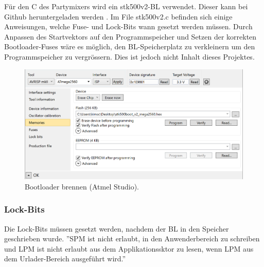 Für den \textmu C des Partymixers wird ein stk500v2-BL verwendet. Dieser kann bei Github heruntergeladen werden \cite{sproul_arduinoarduino-stk500v2-bootloader_2012}. Im File stk500v2.c befinden sich einige Anweisungen, welche Fuse- und Lock-Bits wann gesetzt werden müssen. Durch Anpassen des Startvektors auf den Programmspeicher und Setzen der korrekten Bootloader-Fuses wäre es möglich, den BL-Speicherplatz zu verkleinern um den Programmspeicher zu vergrössern. Dies ist jedoch nicht Inhalt dieses Projektes.



\begin{figure}[H]
	\centering
	\includegraphics[width=\textwidth]{graphics/AtmelStudio_Program_Bootloader}
	\caption{Bootloader brennen (Atmel Studio).}
	\label{fig:AtmelStudio_Program_Bootloader}
\end{figure}

\subsubsection{Lock-Bits}

Die Lock-Bits müssen gesetzt werden, nachdem der BL in den Speicher geschrieben wurde. ''SPM ist nicht erlaubt, in den Anwenderbereich zu schreiben und LPM ist nicht erlaubt aus dem Applikationssktor zu lesen, wenn LPM aus dem Urlader-Bereich ausgeführt wird.''\cite{haftmann_programmierung_nodate}

